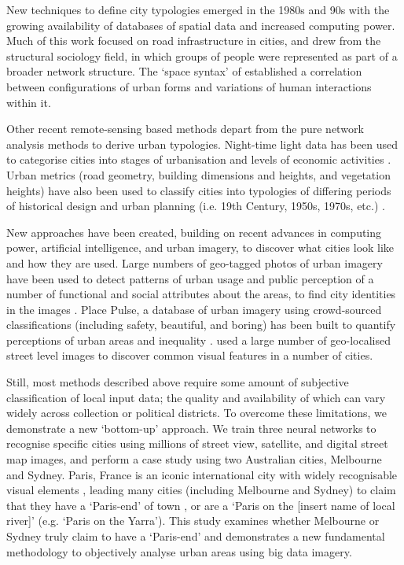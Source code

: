 \documentclass[Crown,sageh,times]{sagej}
\begin{document}
New techniques to define city typologies emerged in the 1980s and 90s with the growing availability of databases of spatial data and increased computing power. Much of this work focused on road infrastructure in cities, and drew from the structural sociology field, in which groups of people were represented as part of a broader network structure. The `space syntax' of \citet{Hillier1996} established a correlation between configurations of urban forms and variations of human interactions within it. 

Other recent remote-sensing based methods depart from the pure network analysis methods to derive urban typologies. Night-time light data has been used to categorise cities into stages of urbanisation and levels of economic activities \citep{Zhang2013}. Urban metrics (road geometry, building dimensions and heights, and vegetation heights) have also been used to classify cities into typologies of differing periods of historical design and urban planning (i.e. 19th Century, 1950s, 1970s, etc.) \citep{Hermosilla2014}.

New approaches have been created, building on recent advances in computing power, artificial intelligence, and urban imagery, to discover what cities look like and how they are used. Large numbers of geo-tagged photos of urban imagery have been used to detect patterns of urban usage and public perception of a number of functional and social attributes about the areas, to find city identities in the images \citep{Liu2016,Zhou2014a}. Place Pulse, a database of urban imagery using crowd-sourced classifications (including safety, beautiful, and boring) has been built to quantify perceptions of urban areas \citep{Dubey2016,Naik2014} and inequality \citep{Salesses2013}. \citet{Doersch2012} used a large number of geo-localised street level images to discover common visual features in a number of cities.

Still, most methods described above require some amount of subjective classification of local input data; the quality and availability of which can vary widely across collection or political districts. To overcome these limitations, we demonstrate a new `bottom-up' approach. We train three neural networks to recognise specific cities using millions of street view, satellite, and digital street map images, and perform a case study using two Australian cities, Melbourne and Sydney. Paris, France is an iconic international city \citep{Anholt2006} with widely recognisable visual elements \citep{Doersch2012}, leading many cities (including Melbourne and Sydney) to claim that they have a `Paris-end' of town \citep{Williams2010}, or are a `Paris on the [insert name of local river]' \citep{Wilden2013} (e.g. `Paris on the Yarra'). This study examines whether Melbourne or Sydney truly claim to have a `Paris-end' and demonstrates a new fundamental methodology to objectively analyse urban areas using big data imagery.
\end{document}
